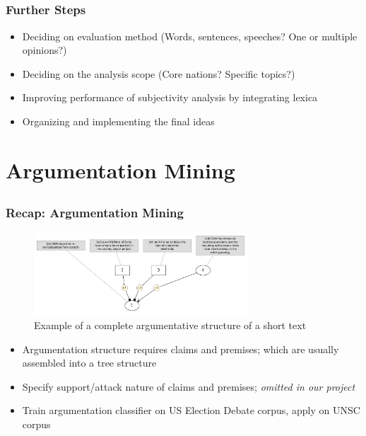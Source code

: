\documentclass{beamer}
\begin{document}
\subsection{}
\begin{framefont}{\footnotesize}
	\begin{frame}
		\frametitle{Further Steps}
		\begin{itemize}
			\setlength\itemsep{1.2em}
			\item Deciding on evaluation method (Words, sentences, speeches? One or multiple opinions?)
			
			\item Deciding on the analysis scope (Core nations? Specific topics?) 
			\item Improving performance of subjectivity analysis by integrating lexica
			\item Organizing and implementing the final ideas
			
			
		\end{itemize}
	\end{frame}
\end{framefont}

\section{Argumentation Mining}
\subsection{}
\begin{framefont}{\footnotesize}
	\begin{frame}
		\frametitle{Recap: Argumentation Mining}
			\begin{figure}				       
			\captionsetup{justification=centering}
		   	\includegraphics[trim={0cm 0cm 0cm 0cm},clip,width=8cm]{args_structure.png}
		   	\caption{Example of a complete argumentative structure of a short text \citep{peldszus2015annotated}}
			\end{figure}
		\begin{itemize}
			\setlength\itemsep{0.8em}
			\item Argumentation structure requires claims and premises; which are usually assembled into a tree structure
			\item Specify support/attack nature of claims and premises; \textit{omitted in our project}
			\item Train argumentation classifier on US Election Debate corpus, apply on UNSC corpus
		\end{itemize}
	\end{frame}
\end{framefont}
\end{document}
